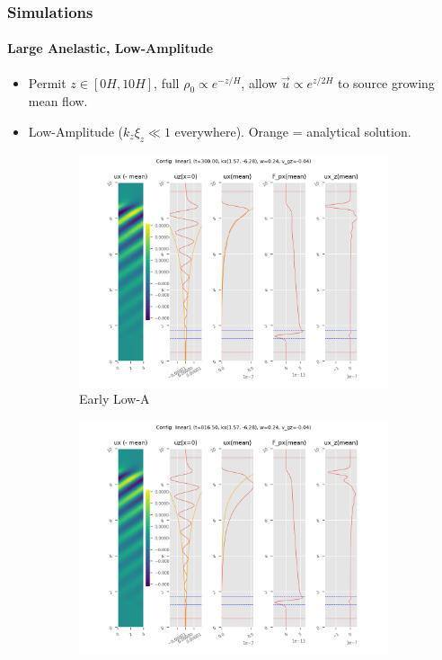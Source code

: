 \documentclass[dvipsnames, 10pt]{beamer}
\begin{document}
\begin{frame}
    \frametitle{Simulations}
    \framesubtitle{Large Anelastic, Low-Amplitude}

    \begin{itemize}
        \item Permit $z \in [0H, 10H]$, full $\rho_0 \propto e^{-z/H}$, allow
            $\vec{u} \propto e^{z/2H}$ to source growing mean flow.

        \item Low-Amplitude ($k_z\xi_z \ll 1$ everywhere). Orange = analytical
            solution.
    \end{itemize}
    \begin{figure}[t]
        \centering
        \hspace*{-19mm}%
        \begin{subfigure}{0.55\textwidth}
            \centering
            \includegraphics[width=\textwidth]{lin_early.png}
            \caption{Early Low-A}
        \end{subfigure}
        \begin{subfigure}{0.55\textwidth}
            \centering
            \includegraphics[width=\textwidth]{lin_late.png}

\end{subfigure}
\end{figure}
\end{frame}
\end{document}
